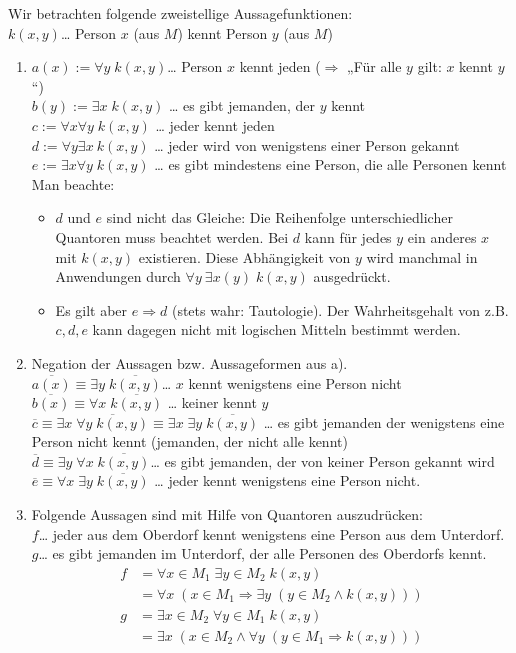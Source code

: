 Wir betrachten folgende zweistellige Aussagefunktionen:\\
$k(x,y)$… Person $x$ (aus $M$) kennt Person $y$ (aus $M$)
\begin{enumerate} [label=\alph*)]
\item $a(x):= \forall y \; k(x,y)$… Person $x$ kennt jeden ($\Rightarrow$ „Für alle $y$ gilt: $x$ kennt $y$“)\\
$b(y):= \exists x \; k(x,y)$ … es gibt jemanden, der $y$ kennt\\
$c := \forall x \forall y \; k(x,y)$ … jeder kennt jeden\\
$d := \forall y \exists x \: k(x,y)$ … jeder wird von wenigstens einer Person gekannt\\
$e := \exists x \forall y \; k(x,y)$ … es gibt mindestens eine Person, die alle Personen kennt\\
Man beachte: \begin{itemize}
\item $d$ und $e$ sind nicht das Gleiche: Die Reihenfolge unterschiedlicher Quantoren muss beachtet werden. Bei $d$ kann für jedes $y$ ein anderes $x$ mit $k(x,y)$ existieren. Diese Abhängigkeit von $y$ wird manchmal in Anwendungen durch $\forall y \: \exists x(y) \; k(x,y)$ ausgedrückt.
\item Es gilt aber $e \Rightarrow d$ (stets wahr: Tautologie). Der Wahrheitsgehalt von z.B. $c, d, e$ kann dagegen nicht mit logischen Mitteln bestimmt werden.
\end{itemize}
\item Negation der Aussagen  bzw. Aussageformen aus a).\\
$\overline{a(x)}\equiv \exists y \; \overline{k(x,y)}$… $x$ kennt wenigstens eine Person nicht\\
$\overline{b(x)} \equiv \forall x \; \overline{k(x,y)}$ … keiner kennt $y$\\
$\overline{c} \equiv \exists x \; \overline{\forall y \; k(x,y)}\equiv \exists x \; \exists y \; \overline{k(x,y)}$ … es gibt jemanden der wenigstens eine Person nicht kennt (jemanden, der nicht alle kennt)\\
$\overline{d} \equiv \exists y \; \forall x \; \overline{k(x,y)}$… es gibt jemanden, der von keiner Person gekannt wird
$\overline{e}\equiv \forall x \; \exists y \; \overline{k(x,y)}$ … jeder kennt wenigstens eine Person nicht.
\item Folgende Aussagen sind mit Hilfe von Quantoren auszudrücken:\\
$f$… jeder aus dem Oberdorf kennt wenigstens eine Person aus dem Unterdorf.\\
$g$… es gibt jemanden im Unterdorf, der alle Personen des Oberdorfs kennt.
\begin{align*}f&=\forall x \in M_1 \; \exists y \in M_2 \; k(x,y)\\
&=\forall x \; (x \in M_1 \Rightarrow \exists y \; (y \in M_2 \wedge k(x,y)))\end{align*}
\begin{align*}
g&= \exists x \in M_2 \; \forall y \in M_1 \; k(x,y)\\
&= \exists x \; (x\in M_2 \wedge \forall y \; (y \in M_1 \Rightarrow k(x,y)))
\end{align*}
\end{enumerate}